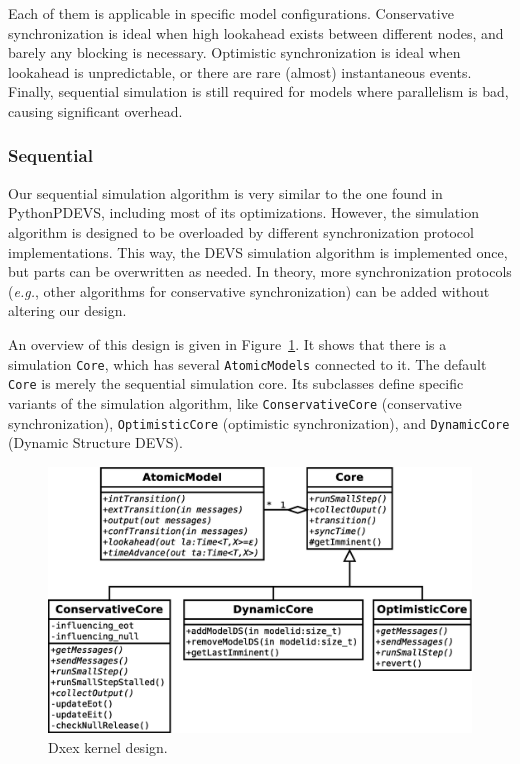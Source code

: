 Each of them is applicable in specific model configurations.
Conservative synchronization is ideal when high lookahead exists between different nodes, and barely any blocking is necessary.
Optimistic synchronization is ideal when lookahead is unpredictable, or there are rare (almost) instantaneous events.
Finally, sequential simulation is still required for models where parallelism is bad, causing significant overhead.

\subsubsection{Sequential}
Our sequential simulation algorithm is very similar to the one found in PythonPDEVS, including most of its optimizations.
However, the simulation algorithm is designed to be overloaded by different synchronization protocol implementations.
This way, the \textsf{DEVS} simulation algorithm is implemented once, but parts can be overwritten as needed.
In theory, more synchronization protocols (\textit{e.g.}, other algorithms for conservative synchronization) can be added without altering our design.

An overview of this design is given in Figure~\ref{fig:class_diagram}.
It shows that there is a simulation \texttt{Core}, which has several \texttt{AtomicModels} connected to it.
The default \texttt{Core} is merely the sequential simulation core.
Its subclasses define specific variants of the simulation algorithm, like \texttt{ConservativeCore} (conservative synchronization), \texttt{OptimisticCore} (optimistic synchronization), and \texttt{DynamicCore} (\textsf{Dynamic Structure DEVS}).

\begin{figure}
    \includegraphics[width=\columnwidth]{fig/cores_class_diagram.eps}
	\caption{Dxex kernel design.}
	\label{fig:class_diagram}
\end{figure}

